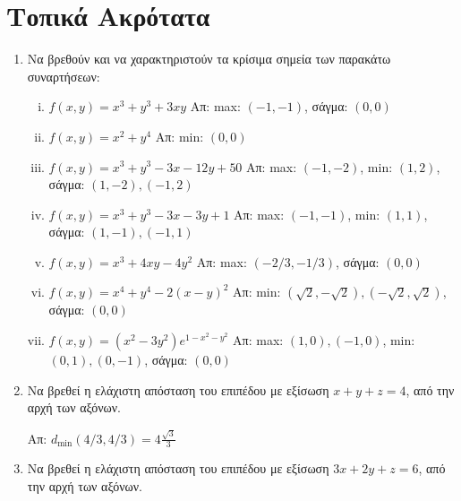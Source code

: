 


\pagestyle{askhseis}

\renewcommand{\vec}{\mathbf}



\begin{center}
  \minibox{\large \bfseries \textcolor{Col1}{Ασκήσεις στα Ακρότατα}}
\end{center}

\vspace{\baselineskip}

\section*{Τοπικά Ακρότατα}

\begin{enumerate}
  \item Να βρεθούν και να χαρακτηριστούν τα κρίσιμα σημεία  των παρακάτω συναρτήσεων:
    \begin{enumerate}[i)]
      \item $ f(x,y) = x^{3} + y^{3} + 3xy $ 
        \hfill Απ: max: $(-1,-1)  $, σάγμα: $ (0,0) $
      \item $ f(x,y) = x^{2}+y^{4} $ 
        \hfill Απ: min: $ (0,0) $ 
      \item $ f(x,y) = x^{3} + y^{3} - 3x -12y + 50 $ 
        \hfill Απ: max: $ (-1,-2)$, min: $ (1,2) $, 
        σάγμα: $ (1,-2), (-1,2) $
      \item $ f(x,y) = x^{3} + y^{3} -3x -3y + 1 $ 
        \hfill Απ: max: $(-1,-1)  $, min: $ (1,1) $,
        σάγμα: $ (1,-1), (-1,1) $
      \item $ f(x,y) = x^{3} + 4xy -4y^{2} $ 
        \hfill Απ: max: $ (-2/3, -1/3)  $, σάγμα: $ (0,0) $
      \item $ f(x,y) = x^{4} + y^{4} -2(x-y)^{2}$  
        \hfill Απ: min: $ (\sqrt{2} , -\sqrt{2}), (-\sqrt{2} , \sqrt{2}) $, 
        σάγμα: $ (0,0) $
      \item $ f(x,y) = (x^{2}-3y^{2})e^{1-x^{2}-y^{2}} $ 
        \hfill Απ: max: $ (1,0), (-1,0) $, min: $ (0,1), (0,-1) $, 
        σάγμα: $ (0,0) $
    \end{enumerate}

  \item Να βρεθεί η ελάχιστη απόσταση του επιπέδου με εξίσωση $ x+y+z=4 $, από την 
    αρχή των αξόνων.

    \hfill Απ: $ d_{\min}(4/3,4/3) = 4\frac{\sqrt{3}}{3} $  

  \item Να βρεθεί η ελάχιστη απόσταση του επιπέδου με εξίσωση $ 3x+2y+z=6 $, από την 
    αρχή των αξόνων.


\end{enumerate}
